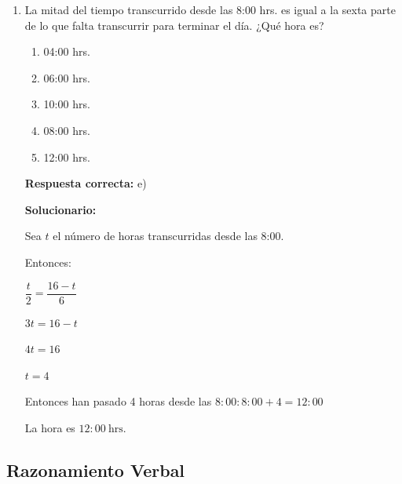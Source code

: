 \begin{enumerate}[resume]
	\vspace{2mm}
	\textbf{Solucionario:}
	
	Si murió el \(12\%\), quedó el \(88\%\) del total:

	$0.88T = 2,200$
	
	$T = \dfrac{2,200}{0.88}=2,500$
	
	Entonces, el rebaño constaba de \(\boxed{2,500}\) alpacas.
	
	\vspace{6mm}
	
	\item La mitad del tiempo transcurrido desde las 8:00 hrs. es igual a la sexta parte de lo que falta transcurrir para terminar el día. ¿Qué hora es?
	\begin{enumerate}[label=\alph*)]
		\item 04:00 hrs.
		\item 06:00 hrs.
		\item 10:00 hrs.
		\item 08:00 hrs.
		\item 12:00 hrs.
	\end{enumerate}
	\textbf{Respuesta correcta:} e)
	
	\vspace{2mm}
	\textbf{Solucionario:}
	
	Sea \(t\) el número de horas transcurridas desde las 8:00.
	
	Entonces:

	$\dfrac{t}{2}=\dfrac{16-t}{6}$
	
	$3t = 16 - t$
	
	$4t = 16$
	
	$t=4$
	
	Entonces han pasado 4 horas desde las $8:00:
	8:00 + 4 = 12:00$

	La hora es \(\boxed{12:00\ \text{hrs.}}\)
	
	\vspace{6mm}
	
\end{enumerate}

\subsection*{Razonamiento Verbal}

